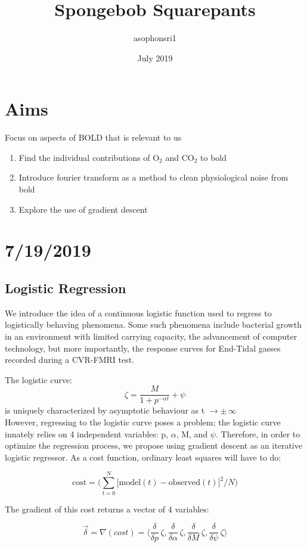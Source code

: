 \documentclass{article}
\title{Spongebob Squarepants}
\author{asophonsri1 }
\date{July 2019}
\begin{document}
\maketitle

\section*{Aims}
Focus on aspects of BOLD that is relevant to us
\begin{enumerate}
    \item Find the individual contributions of O$_2$ and CO$_2$ to bold
    \item Introduce fourier transform as a method to clean physiological noise from bold
    \item Explore the use of gradient descent
\end{enumerate}

\section*{7/19/2019}
\subsection*{Logistic Regression}
We introduce the idea of a continuous logistic function used to regress to logistically behaving phenomena. Some such phenomena include bacterial growth in an environment with limited carrying capacity, the advancement of computer technology, but more importantly, the response curves for End-Tidal gasses recorded during a CVR-FMRI test.

The logistic curve:
$$ \zeta = \frac{M}{1+p^{-\alpha t}} + \psi$$
is uniquely characterized by asymptotic behaviour as t $\rightarrow \pm\, \infty$
\\[2\baselineskip]
However, regressing to the logistic curve poses a problem; the logistic curve innately relies on 4 independent variables: p, $\alpha$, M, and $\psi$.
Therefore, in order to optimize the regression process, we propose using gradient descent as an iterative logistic regressor. As a cost function, ordinary least squares will have to do:

$$ \text{cost} = \Big(\sum_{t=0}^{N} \big[\text{model}(t) - \text{observed}(t)\big]^2/N\Big) $$

\noindent
The gradient of this cost returns a vector of 4 variables:

$$ \vec{\delta} = \nabla(cost) =  \Big\langle \frac{\delta}{\delta p}\,\zeta,\frac{\delta}{\delta \alpha}\,\zeta,\frac{\delta}{\delta M}\,\zeta,\frac{\delta}{\delta \psi}\,\zeta \Big\rangle  $$
\end{document}
